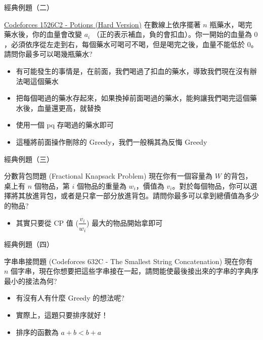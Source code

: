 \documentclass[aspectratio=169]{beamer}
\begin{document}
    \begin{frame}{經典例題（二）}
        \begin{block}{\href{https://codeforces.com/problemset/problem/1526/C2}{Codeforces 1526C2 - Potions (Hard Version)}}
            在數線上依序擺著 $n$ 瓶藥水，喝完藥水後，你的血量會改變 $a_i$ （正的表示補血，負的會扣血）。你一開始的血量為 $0$，必須依序從左走到右，每個藥水可喝可不喝，但是喝完之後，血量不能低於 $0$。請問你最多可以喝幾瓶藥水?
        \end{block}
        \begin{itemize}
            \item 有可能發生的事情是，在前面，我們喝過了扣血的藥水，導致我們現在沒有辦法喝這個藥水
            \item<2-> 把每個喝過的藥水存起來，如果換掉前面喝過的藥水，能夠讓我們喝完這個藥水後，血量還更高，就替換
            \item<3-> 使用一個 pq 存喝過的藥水即可
            \item<4-> 這種將前面操作刪除的 Greedy，我們一般稱其為反悔 Greedy
        \end{itemize}
    \end{frame}
    
    \begin{frame}{經典例題（三）}
        \begin{block}{分數背包問題 (Fractional Knapsack Problem)}
            現在你有一個容量為 $W$ 的背包，桌上有 $n$ 個物品，第 $i$ 個物品的重量為 $w_i$，價值為 $v_i$。對於每個物品，你可以選擇將其放進背包，或者是只拿一部分放進背包。請問你最多可以拿到總價值為多少的物品?
        \end{block}
        \begin{itemize}
            \item<2-> 其實只要從 CP 值 ($\dfrac{v_i}{w_i}$) 最大的物品開始拿即可
        \end{itemize}
    \end{frame}
    
    \begin{frame}{經典例題（四）}
        \begin{block}{字串串接問題 (Codeforces 632C - The Smallest String Concatenation)}
            現在你有 $n$ 個字串，現在你想要把這些字串接在一起，請問能使最後接出來的字串的字典序最小的接法為何?
        \end{block}
        \begin{itemize}
            \item<2-> 有沒有人有什麼 Greedy 的想法呢?
            \item<3-> 實際上，這題只要排序就好！
            \item<4-> 排序的函數為 $a+b < b+a$
        \end{itemize}
    \end{frame}
    
\end{document}
